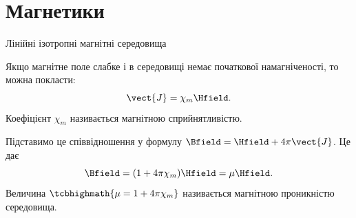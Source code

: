 \documentclass[onlytextwidth]{beamer}
\begin{document}
\section{Магнетики}





\begin{frame}{Лінійні ізотропні магнітні середовища}{}
	\begin{block}{}
		Якщо магнітне поле слабке і в середовищі немає початкової намагніченості, то можна покласти:
		\begin{equation*}
			\vect{J} = \chi_m\Hfield.
		\end{equation*}
		Коефіцієнт $ \chi_m$ називається \alert{магнітною сприйнятливістю}.

		Підставимо це співвідношення у формулу $\Bfield = \Hfield + 4\pi\vect{J}$. Це дає
		\begin{equation*}
			\Bfield = (1+4\pi\chi_m)\Hfield = \mu\Hfield.
		\end{equation*}
		Величина $\tcbhighmath{\mu = 1+4\pi\chi_m}$ називається \alert{магнітною проникністю середовища}.
	\end{block}
\end{frame}
\end{document}
